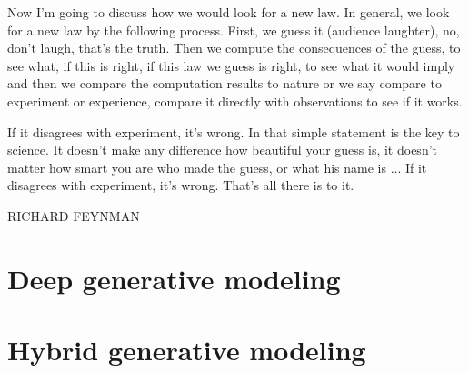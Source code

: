 \documentclass[twoside,openright,titlepage,numbers=noenddot,headinclude,%
               footinclude=true,cleardoublepage=empty,abstractoff,BCOR=5mm,%
               paper=a4,fontsize=11pt,english]{scrreprt}
\numberwithin{theorem}{chapter}
\numberwithin{definition}{chapter}
\numberwithin{algorithm}{chapter}
\numberwithin{figure}{chapter}
\numberwithin{table}{chapter}
\numberwithin{equation}{chapter}
\begin{document}
\frenchspacing
\raggedbottom
{}
\pagestyle{plain}



\cleardoublepage
\cleardoublepage
\cleardoublepage
\pagestyle{scrheadings}
\cleardoublepage



{\centering
\parbox{\textwidth}{%
  \raggedright{\normal\itshape%

  Now I'm going to discuss how we would look for a new law. In general, we look for a new law by the following process. First, we guess it (audience laughter), no, don't laugh, that's the truth. Then we compute the consequences of the guess, to see what, if this is right, if this law we guess is right, to see what it would imply and then we compare the computation results to nature or we say compare to experiment or experience, compare it directly with observations to see if it works.

  If it disagrees with experiment, it's wrong. In that simple statement is the key to science. It doesn't make any difference how beautiful your guess is, it doesn't matter how smart you are who made the guess, or what his name is ... If it disagrees with experiment, it's wrong. That's all there is to it.\par\bigskip
  }
  \raggedleft\normal\MakeUppercase{Richard Feynman}\par%
}}

\vfill\vfill


\cleardoublepage

\cleardoublepage
\cleardoublepage
\part{Deep generative modeling}\label{part:1}
\cleardoublepage
\cleardoublepage

\part{Hybrid generative modeling}\label{part:2}
\end{document}
